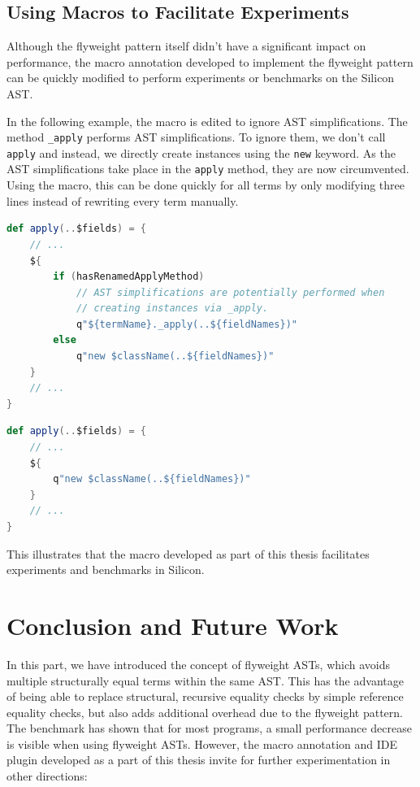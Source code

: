 \documentclass[11pt]{article}
\begin{document}
    \subsection{Using Macros to Facilitate Experiments}

    Although the flyweight pattern itself didn't have a significant impact on performance,
    the macro annotation developed to implement the flyweight pattern can
    be quickly modified to perform experiments or benchmarks on the Silicon AST.

    In the following example, the macro is edited to ignore AST simplifications.
    The method \texttt{\_apply} performs AST simplifications. To ignore 
    them, we don't call \texttt{apply} and instead,
    we directly create instances using the \texttt{new} keyword.
    As the AST simplifications take place in the \texttt{apply} method, they are now circumvented.
    Using the macro, this can be done quickly for all terms by only modifying three lines
    instead of rewriting every term manually.

    \begin{lstlisting}[language=Scala, caption=Use AST simplifications as normal.]
def apply(..$fields) = {
    // ...
    ${
        if (hasRenamedApplyMethod)
            // AST simplifications are potentially performed when
            // creating instances via _apply.
            q"${termName}._apply(..${fieldNames})"
        else
            q"new $className(..${fieldNames})"
    }
    // ...
}  
    \end{lstlisting}

    \begin{lstlisting}[language=Scala, caption=Modified macro to ignore AST simplifications.]
def apply(..$fields) = {
    // ...
    ${
        q"new $className(..${fieldNames})"
    }
    // ...
}  
    \end{lstlisting}

    This illustrates that the macro developed as part of this thesis
    facilitates experiments and benchmarks in Silicon.



    \newpage
    \section{Conclusion and Future Work}

    In this part, we have introduced the concept of flyweight ASTs,
    which avoids multiple structurally equal terms within the same AST.
    This has the advantage of being able to replace structural, recursive
    equality checks by simple reference equality checks, but also adds
    additional overhead due to the flyweight pattern.
    The benchmark has shown that for most programs,
    a small performance decrease is visible when using flyweight ASTs.
    However, the macro annotation and IDE plugin
    developed as a part of this thesis invite for further
    experimentation in other directions:
\end{document}
